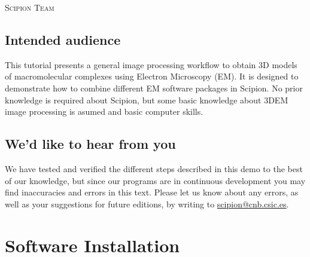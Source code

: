 \documentclass[12pt]{article} %
\begin{document}
\begin{titlepage}
\vfill %
\begin{flushright}
 \large
  \textsc{Scipion Team} %
\end{flushright}

\end{titlepage}




\subsection*{Intended audience}

This tutorial presents a general image processing workflow to obtain
3D models of macromolecular complexes using Electron Microscopy (EM).
It is designed to demonstrate how to combine
different EM software packages in Scipion. No prior knowledge is required
about Scipion, but some basic knowledge about 3DEM image processing is asumed
and basic computer skills.

\subsection*{We'd like to hear from you}

We have tested and verified the different steps described in this demo
to the best of our knowledge, but since our programs are in continuous
development you may find inaccuracies and errors in this text. Please
let us know about any errors, as well as your suggestions for
future editions, by writing to
\href{mailto:scipion@cnb.csic.es}{scipion@cnb.csic.es}.

\newpage



\tableofcontents %

\newpage %


\section{Software Installation}
\end{document}
